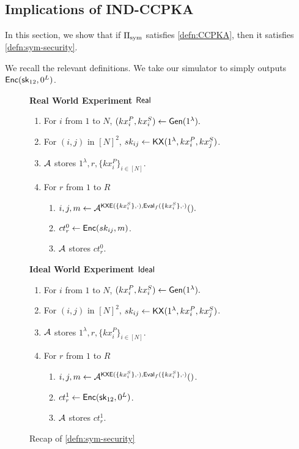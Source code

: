 \subsection{Implications of IND-CCPKA}
In this section, we show that if $\Pi_{\text{sym}}$ satisfies \cref{defn:CCPKA}, then it satisfies \cref{defn:sym-security}.

We recall the relevant definitions. We take our simulator to simply outputs $\mathsf{Enc}({\mathsf{sk}}_{12}, 0^{L})$.
\begin{figure}[h!]
\begin{framed}
\textbf{Real World Experiment $\mathsf{Real}$}
\begin{enumerate}
    \item For $i$ from $1$ to $N$, $(kx_i^P, kx_i^S) \leftarrow \mathsf{Gen}(1^{\lambda}).$
    \item For $(i, j)$ in $[N]^2$, $sk_{ij} \leftarrow \mathsf{KX}(1^{\lambda}, kx_i^P, kx_j^S)$.
    \item $\mathcal{A}$ stores $1^{\lambda}, r, \{kx_i^P\}_{i \in [N]}$.
    \item For $r$ from $1$ to $R$
    \begin{enumerate}
        \item $i, j, m \leftarrow \mathcal{A}^{\mathsf{KXE}(\{kx_i^S\}, \cdot), \mathsf{Eval}_f(\{kx_i^S\}, \cdot)}().$
        \item $ct^{0}_r \leftarrow \mathsf{Enc}(sk_{ij}, m)$.
        \item $\mathcal{A}$ stores $ct^{0}_r$.
    \end{enumerate}
\end{enumerate}
\textbf{Ideal World Experiment $\mathsf{Ideal}$}
\begin{enumerate}
    \item For $i$ from $1$ to $N$, $(kx_i^P, kx_i^S) \leftarrow \mathsf{Gen}(1^{\lambda}).$
    \item For $(i, j)$ in $[N]^2$, $sk_{ij} \leftarrow \mathsf{KX}(1^{\lambda}, kx_i^P, kx_j^S)$.
    \item $\mathcal{A}$ stores $1^{\lambda}, r, \{kx_i^P\}_{i \in [N]}$.
    \item For $r$ from $1$ to $R$
    \begin{enumerate}
        \item $i, j, m \leftarrow \mathcal{A}^{\mathsf{KXE}(\{kx_i^S\}, \cdot), \mathsf{Eval}_f(\{kx_i^S\}, \cdot)}()$.
        \item $ct^1_r \leftarrow \mathsf{Enc}({\mathsf{sk}}_{12}, 0^{L})$.
        \item $\mathcal{A}$ stores $ct^{1}_r$.
    \end{enumerate}
\end{enumerate}
\end{framed}
\caption{Recap of \cref{defn:sym-security}}
\end{figure}
